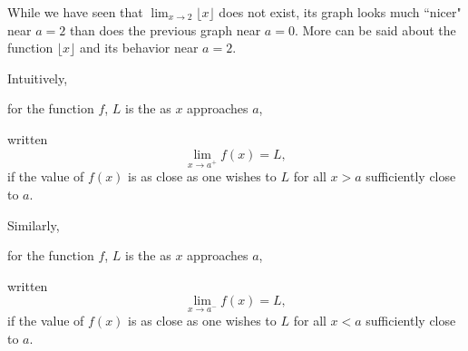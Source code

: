 \documentclass{ximera}
\begin{document}
While we have seen that $\lim_{x\to 2}\lfloor x\rfloor$ does not
exist, its graph looks much ``nicer" near $a=2$ than does the previous graph near $a=0$. More can be said about the function $\lfloor x\rfloor$ and its behavior near $a=2$.



\begin{definition}
  Intuitively,

   for the function $f$,  $L$ is the  as $x$ approaches $a$,

  written
  \[
  \lim_{x\to a^+} f(x) = L,
  \]
  if the value of $f(x)$ is as close as one wishes to $L$ for
  all $x>a$ sufficiently close to $a$.

  Similarly,


   for  the function $f$, $L$ is the  as $x$ approaches $a$,


  written
  \[
  \lim_{x\to a^-} f(x) = L,
  \]
  if the value of $f(x)$ is as close as one wishes to $L$ for
  all $x<a$ sufficiently close to $a$.

\end{definition}
\end{document}
